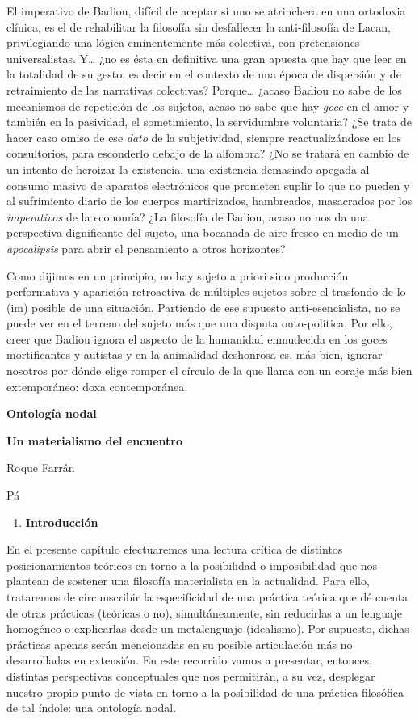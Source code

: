 El imperativo de Badiou, difícil de aceptar si uno se atrinchera en una ortodoxia clínica, es el de rehabilitar la filosofía sin desfallecer la anti-filosofía de Lacan, privilegiando una lógica eminentemente más colectiva, con pretensiones universalistas. Y\ldots{} ¿no es ésta en definitiva una gran apuesta que hay que leer en la totalidad de su gesto, es decir en el contexto de una época de dispersión y de retraimiento de las narrativas colectivas? Porque\ldots{} ¿acaso Badiou no sabe de los mecanismos de repetición de los sujetos, acaso no sabe que hay \emph{goce} en el amor y también en la pasividad, el sometimiento, la servidumbre voluntaria? ¿Se trata de hacer caso omiso de ese \emph{dato} de la subjetividad, siempre reactualizándose en los consultorios, para esconderlo debajo de la alfombra? ¿No se tratará en cambio de un intento de heroizar la existencia, una existencia demasiado apegada al consumo masivo de aparatos electrónicos que prometen suplir lo que no pueden y al sufrimiento diario de los cuerpos martirizados, hambreados, masacrados por los \emph{imperativos} de la economía? ¿La filosofía de Badiou, acaso no nos da una perspectiva dignificante del sujeto, una bocanada de aire fresco en medio de un \emph{apocalipsis} para abrir el pensamiento a otros horizontes?

Como dijimos en un principio, no hay sujeto a priori sino producción performativa y aparición retroactiva de múltiples sujetos sobre el trasfondo de lo (im) posible de una situación. Partiendo de ese supuesto anti-esencialista, no se puede ver en el terreno del sujeto más que una disputa onto-política. Por ello, creer que Badiou ignora el aspecto de la humanidad enmudecida en los goces mortificantes y autistas y en la animalidad deshonrosa es, más bien, ignorar nosotros por dónde elige romper el círculo de la que llama con un coraje más bien extemporáneo: doxa contemporánea.

\textbf{Ontología nodal}

\textbf{Un materialismo del encuentro}

Roque Farrán

Pá

\begin{enumerate}
\def\labelenumi{\arabic{enumi}.}
\item
  \textbf{Introducción}
\end{enumerate}

En el presente capítulo efectuaremos una lectura crítica de distintos posicionamientos teóricos en torno a la posibilidad o imposibilidad que nos plantean de sostener una filosofía materialista en la actualidad. Para ello, trataremos de circunscribir la especificidad de una práctica teórica que dé cuenta de otras prácticas (teóricas o no), simultáneamente, sin reducirlas a un lenguaje homogéneo o explicarlas desde un metalenguaje (idealismo). Por supuesto, dichas prácticas apenas serán mencionadas en su posible articulación más no desarrolladas en extensión. En este recorrido vamos a presentar, entonces, distintas perspectivas conceptuales que nos permitirán, a su vez, desplegar nuestro propio punto de vista en torno a la posibilidad de una práctica filosófica de tal índole: una ontología nodal.

